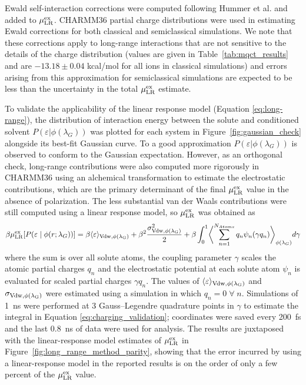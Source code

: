 \documentclass[journal=jacsat,articletitle=true,manuscript=suppinfo,layout=onecolumn]{achemso}
\begin{document}
    Ewald self-interaction corrections were computed following Hummer et al. and added to $\mu^{\rm{ex}}_{\rm{LR}}$.\cite{Hummer1996} CHARMM36 partial charge distributions were used in estimating Ewald corrections for both classical and semiclassical simulations. We note that these corrections apply to long-range interactions that are not sensitive to the details of the charge distribution (values are given in Table~\ref{tab:mqct_results} and are $-13.18 \pm 0.04$ kcal/mol for all ions in classical simulations) and errors arising from this approximation for semiclassical simulations are expected to be less than the uncertainty in the total $\mu^{\rm{ex}}_{\rm{LR}}$ estimate.

    To validate the applicability of the linear response model (Equation \ref{eq:long-range}), the distribution of interaction energy between the solute and conditioned solvent $P(\varepsilon | \phi(\lambda_G))$ was plotted for each system in Figure~\ref{fig:gaussian_check} alongside its best-fit Gaussian curve. To a good approximation $P(\varepsilon | \phi(\lambda_G))$ is observed to conform to the Gaussian expectation. However, as an orthogonal check, long-range contributions were also computed more rigorously in CHARMM36 using an alchemical transformation to estimate the electrostatic contributions, which are the primary determinant of the final $\mu^{\rm{ex}}_{\rm{LR}}$ value in the absence of polarization. The less substantial van der Waals contributions were still computed using a linear response model, so $\mu^{\rm{ex}}_{\rm{LR}}$ was obtained as
    \begin{equation}
    \beta \mu^{\rm{ex}}_{\rm{LR}}[P(\varepsilon \; | \; \phi(r; \lambda_G))] = \beta \langle \varepsilon \rangle_{\rm{Vdw}, \phi(\lambda_G)} + \beta^2 \frac{\sigma_{\rm{Vdw}, \phi(\lambda_G)}^2}{2} + \beta \int_{0}^{1} \biggl< \sum_{n=1}^{N_{Atoms}} q_n \psi_n (\gamma q_n) \biggr>_{\phi(\lambda_G)} d \gamma
    \label{eq:charging_validation}
    \end{equation}
    where the sum is over all solute atoms, the coupling parameter $\gamma$ scales the atomic partial charges $q_n$ and the electrostatic potential at each solute atom $\psi_n$ is evaluated for scaled partial charges $\gamma q_n$. The values of $\langle \varepsilon \rangle_{\rm{Vdw}, \phi(\lambda_G)}$ and $\sigma_{\rm{Vdw}, \phi(\lambda_G)}$ were estimated using a simulation in which $q_n = 0 \; \forall \; n$. Simulations of 1~ns were performed at 3 Gauss–Legendre quadrature points in $\gamma$ to estimate the integral in Equation \ref{eq:charging_validation}; coordinates were saved every 200~fs and the last 0.8~ns of data were used for analysis. The results are juxtaposed with the linear-response model estimates of $\mu^{\rm{ex}}_{\rm{LR}}$ in Figure~\ref{fig:long_range_method_parity}, showing that the error incurred by using a linear-response model in the reported results is on the order of only a few percent of the $\mu^{\rm{ex}}_{\rm{LR}}$ value.
\end{document}
